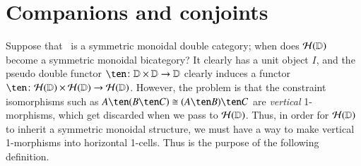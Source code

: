 \documentclass{amsart}
\begin{document}
\section{Companions and conjoints}
\label{sec:comp-conj}

Suppose that \lD\ is a symmetric monoidal double category; when does
$\mathcal{H}(\mathbb{D})$ become a symmetric monoidal bicategory?  It clearly has a
unit object $I$, and the pseudo double functor $\ten\maps
\lD\times\lD\to\lD$ clearly induces a functor $\ten\maps
\cH(\lD)\times\cH(\lD)\to\cH(\lD)$.  However, the problem is that the
constraint isomorphisms such as $A\ten (B\ten C)\iso (A\ten B)\ten C$
are \emph{vertical} 1-morphisms, which get discarded when we pass to
$\mathcal{H}(\mathbb{D})$.  Thus, in order for $\mathcal{H}(\mathbb{D})$ to inherit a symmetric
monoidal structure, we must have a way to make vertical 1-morphisms
into horizontal 1-cells.  Thus is the purpose of the following
definition.
\end{document}
